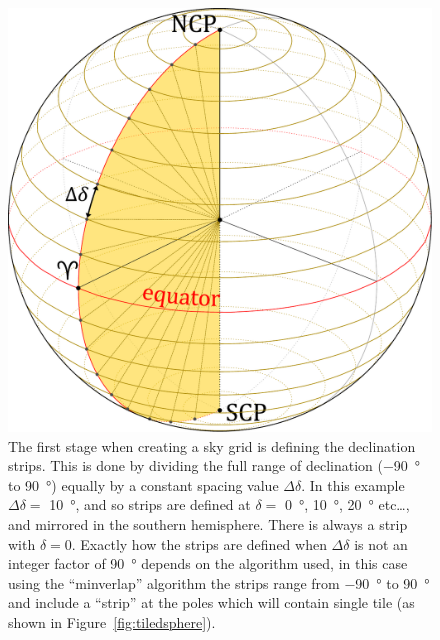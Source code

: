\begin{colsection}
\begin{colsection}
\begin{figure}[p]
\begin{center}
\includegraphics[width=\linewidth]{images/globe2.pdf}
\end{center}
\caption[Defining declination strips]{The first stage when creating a sky grid is defining the declination strips. This is done by dividing the full range of declination (\SI{-90}{\degree} to \SI{90}{\degree}) equally by a constant spacing value $\Delta\delta$. In this example $\Delta\delta =$ \SI{10}{\degree}, and so strips are defined at $\delta=$ \SI{0}{\degree}, \SI{10}{\degree}, \SI{20}{\degree} etc\ldots, and mirrored in the southern hemisphere. There is always a strip with $\delta=0$. Exactly how the strips are defined when $\Delta\delta$ is not an integer factor of \SI{90}{\degree} depends on the algorithm used, in this case using the ``minverlap'' algorithm the strips range from \SI{-90}{\degree} to \SI{90}{\degree} and include a ``strip'' at the poles which will contain single tile (as shown in Figure~\ref{fig:tiledsphere}).
}
\label{fig:deltadelta}
\end{figure}


\end{colsection}
\end{colsection}
